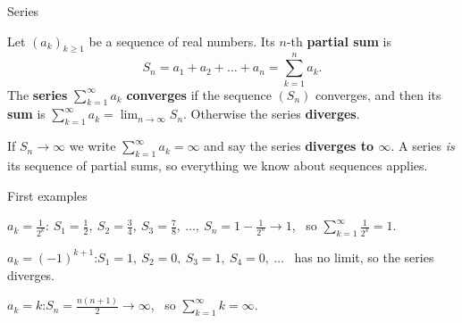 \documentclass[10pt]{wosm-slides}
\begin{document}
\begin{frame}{Series}
  \begin{definition}
    Let $(a_k)_{k \ge 1}$ be a sequence of real numbers. Its $n$-th \textbf{partial sum} is
    \[ S_n = a_1 + a_2 + \dots + a_n = \sum_{k=1}^{n} a_k . \]
    The \textbf{series} $\sum_{k=1}^{\infty} a_k$ \textbf{converges} if the sequence
    $(S_n)$ converges, and then its \textbf{sum} is
    $\displaystyle\sum_{k=1}^{\infty} a_k = \lim_{n\to\infty} S_n$.
    Otherwise the series \textbf{diverges}.
  \end{definition}
  If $S_n \to \infty$ we write $\sum_{k=1}^\infty a_k = \infty$ and say the series
  \textbf{diverges to $\infty$}.
  A series \emph{is} its sequence of partial sums, so everything we know about sequences applies.
\end{frame}

\begin{frame}{First examples}
  \begin{example}[Halves]
    $a_k = \frac{1}{2^k}$:\quad
    $S_1 = \frac12,\ S_2 = \frac34,\ S_3 = \frac78,\ \dots,\ S_n = 1 - \frac{1}{2^n} \to 1$,
    \ so $\sum_{k=1}^\infty \frac1{2^k} = 1$.
  \end{example}
  \pause
  \begin{example}
    $a_k = (-1)^{k+1}$:\quad $S_1 = 1,\ S_2 = 0,\ S_3 = 1,\ S_4 = 0,\ \dots$ \
    has no limit, so the series diverges.
  \end{example}
  \pause
  \begin{example}
    $a_k = k$:\quad $S_n = \frac{n(n+1)}{2} \to \infty$, \ so $\sum_{k=1}^\infty k = \infty$.
  \end{example}
\end{frame}
\end{document}
